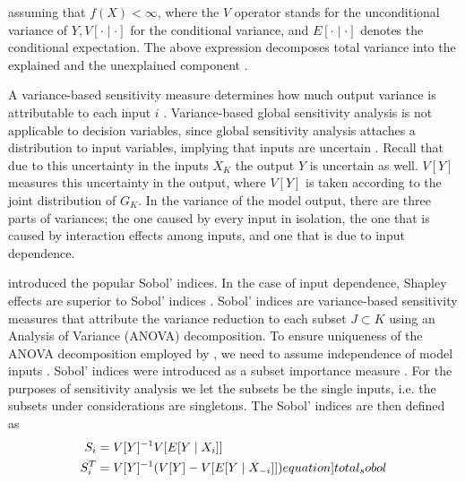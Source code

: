 \noindent assuming that $f(X) < \infty$, where the $V$ operator stands for the unconditional variance of $Y, V[\cdot \mid \cdot]$ for the conditional variance, and $E[\cdot \mid \cdot]$ denotes the conditional expectation. The above expression decomposes total variance into the explained and the unexplained component \citep{GM17}.

A variance-based sensitivity measure determines how much output variance is attributable to each input $i$ \citep{BP16}. Variance-based global sensitivity analysis is not applicable to decision variables, since global sensitivity analysis attaches a distribution to input variables, implying that inputs are uncertain \citep{SNS16}. Recall that due to this uncertainty in the inputs $X_K$ the output $Y$ is uncertain as well. $V[Y]$ measures this uncertainty in the output, where $V[Y]$ is taken according to the joint distribution of $G_K$. In the variance of the model output, there are three parts of variances; the one caused by every input in isolation, the one that is caused by interaction effects among inputs, and one that is due to input dependence.

\citet{S93} introduced the popular Sobol' indices. In the case of input dependence, Shapley effects are superior to Sobol' indices \citep{O14}. Sobol' indices are variance-based sensitivity measures that attribute the variance reduction to each subset $J \subset K$ using an Analysis of Variance (ANOVA) decomposition. To ensure uniqueness of the ANOVA decomposition employed by \citet{S53}, we need to assume independence of model inputs \citep{GM17}. Sobol' indices were introduced as a subset importance measure \citep{SNS16}. For the purposes of sensitivity analysis we let the subsets be the single inputs, i.e. the subsets under considerations are singletons. The Sobol' indices are then defined as
\begin{align*}
S_i &= V[Y]^{-1} V[E[Y \mid X_i]]\\
S_i^T &= V[Y]^{-1}(V[Y] - V[E[Y \mid {X_{- i}}]])
\label[equation]{total_sobol}
\end{align*}


